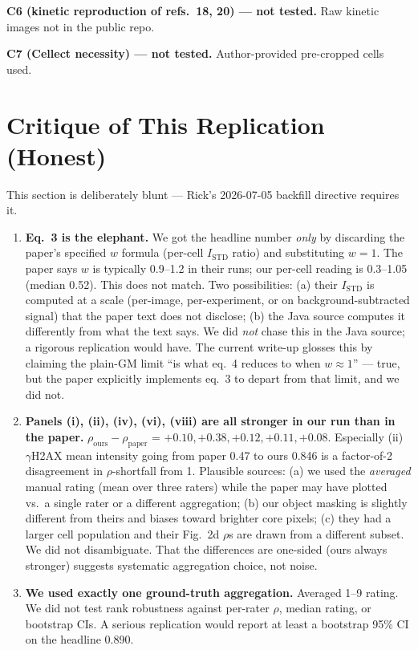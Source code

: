 \documentclass[11pt]{article}
\begin{document}
\textbf{C6 (kinetic reproduction of refs.\ 18, 20) --- not tested.} Raw kinetic images not in the public repo.

\textbf{C7 (Cellect necessity) --- not tested.} Author-provided pre-cropped cells used.

\section{Critique of This Replication (Honest)}
This section is deliberately blunt --- Rick's 2026-07-05 backfill directive requires it.

\begin{enumerate}
\item \textbf{Eq.\ 3 is the elephant.} We got the headline number \emph{only} by discarding the paper's specified $w$ formula (per-cell $I_\mathrm{STD}$ ratio) and substituting $w=1$. The paper says $w$ is typically 0.9--1.2 in their runs; our per-cell reading is 0.3--1.05 (median 0.52). This does not match. Two possibilities: (a) their $I_\mathrm{STD}$ is computed at a scale (per-image, per-experiment, or on background-subtracted signal) that the paper text does not disclose; (b) the Java source computes it differently from what the text says. We did \emph{not} chase this in the Java source; a rigorous replication would have. The current write-up glosses this by claiming the plain-GM limit ``is what eq.~4 reduces to when $w \approx 1$'' --- true, but the paper explicitly implements eq.~3 to depart from that limit, and we did not.
\item \textbf{Panels (i), (ii), (iv), (vi), (viii) are all stronger in our run than in the paper.} $\rho_\mathrm{ours} - \rho_\mathrm{paper}$ = $+0.10, +0.38, +0.12, +0.11, +0.08$. Especially (ii) $\gamma$H2AX mean intensity going from paper 0.47 to ours 0.846 is a factor-of-2 disagreement in $\rho$-shortfall from 1. Plausible sources: (a) we used the \emph{averaged} manual rating (mean over three raters) while the paper may have plotted vs.\ a single rater or a different aggregation; (b) our object masking is slightly different from theirs and biases toward brighter core pixels; (c) they had a larger cell population and their Fig.~2d $\rho$s are drawn from a different subset. We did not disambiguate. That the differences are one-sided (ours always stronger) suggests systematic aggregation choice, not noise.
\item \textbf{We used exactly one ground-truth aggregation.} Averaged 1--9 rating. We did not test rank robustness against per-rater $\rho$, median rating, or bootstrap CIs. A serious replication would report at least a bootstrap 95\% CI on the headline 0.890.

\end{enumerate}
\end{document}
